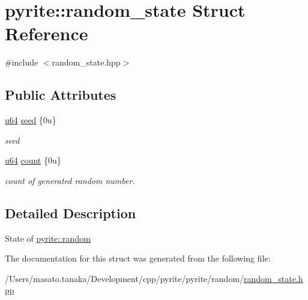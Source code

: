 \hypertarget{structpyrite_1_1random__state}{}\section{pyrite\+:\+:random\+\_\+state Struct Reference}
\label{structpyrite_1_1random__state}


{\ttfamily \#include $<$random\+\_\+state.\+hpp$>$}

\subsection*{Public Attributes}
\begin{DoxyCompactItemize}
\item 
\mbox{\label{structpyrite_1_1random__state_a0e2c55b67459b8e81c7d94cde7aab26a}} 
\mbox{\hyperlink{type_8hpp_a89cb75b6e56f357c2964bbd5520be899}{u64}} \mbox{\hyperlink{structpyrite_1_1random__state_a0e2c55b67459b8e81c7d94cde7aab26a}{seed}} \{0u\}
\begin{DoxyCompactList}\small\item\em seed \end{DoxyCompactList}\item 
\mbox{\label{structpyrite_1_1random__state_ad78110ffa166ae4f6506f81c7084e42a}} 
\mbox{\hyperlink{type_8hpp_a89cb75b6e56f357c2964bbd5520be899}{u64}} \mbox{\hyperlink{structpyrite_1_1random__state_ad78110ffa166ae4f6506f81c7084e42a}{count}} \{0u\}
\begin{DoxyCompactList}\small\item\em count of generated random number. \end{DoxyCompactList}\end{DoxyCompactItemize}


\subsection{Detailed Description}
State of \mbox{\hyperlink{classpyrite_1_1random}{pyrite\+::random}} 

The documentation for this struct was generated from the following file\+:\begin{DoxyCompactItemize}
\item 
/\+Users/masato.\+tanaka/\+Development/cpp/pyrite/pyrite/random/\mbox{\hyperlink{random__state_8hpp}{random\+\_\+state.\+hpp}}\end{DoxyCompactItemize}
